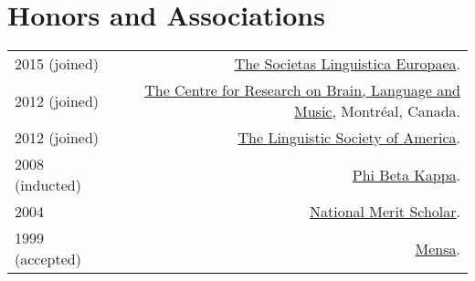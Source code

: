 \documentclass[11pt,letterpaper,twoside]{article}
\makeatletter
\newcommand{\myvrule}{\color{lightgray}\vrule width 1.0pt}
\newenvironment{cvsection}{%
  \renewcommand{\arraystretch}{1.75}
  \begin{longtable}[l]{@{} L R @{}}
}{%
  \end{longtable}
}
\makeatother
\begin{document}
\section*{Honors and Associations}

\begin{cvsection}
  2015 {\footnotesize (joined)} & \href{http://www.societaslinguistica.eu/}{The
    Societas Linguistica Europaea}. \\

  2012 {\footnotesize (joined)} & \href{http://www.crblm.ca/}{The Centre for
    Research on Brain, Language and Music}, Montr\'{e}al, Canada. \\

  2012 {\footnotesize (joined)} &
  \href{http://www.linguisticsociety.org/}{The Linguistic Society of America}. \\

  2008 {\footnotesize (inducted)} & \href{http://www.pbk.org/}{Phi Beta Kappa}. \\

  2004 & \href{http://www.nationalmerit.org/}{National Merit Scholar}. \\

  1999 {\footnotesize (accepted)} & \href{http://www.mensa.org/}{Mensa}. \\
\end{cvsection}




\end{document}
